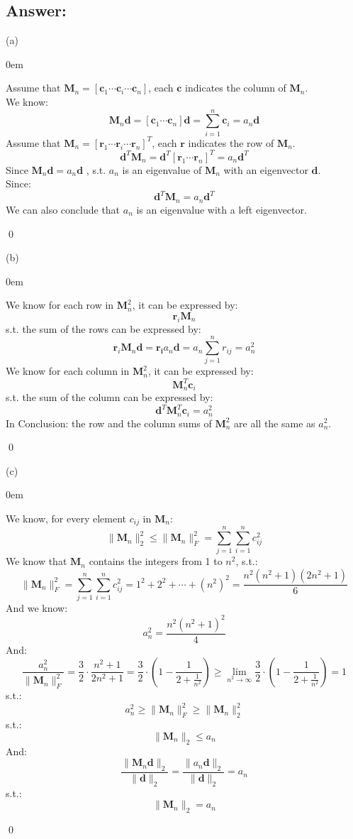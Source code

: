 \documentclass{article}
\renewenvironment{proof}{\begin{addmargin}[1em]{0em}\begin{newproof}}
{\end{newproof}\end{addmargin}\qed}
\begin{document}
\subsection*{Answer:}
(a)
\begin{proof}
    Assume that \(\bm{M}_n = [\bm{c}_1 \cdots \bm{c}_i \cdots \bm{c}_n]\), each \(\bm{c}\) indicates the column of \(\bm{M}_n\). \\
    We know:
    \[
    \bm{M}_n\bm{d} = [\bm{c}_1 \cdots \bm{c}_n ] \bm{d} = \sum_{i=1}^n \bm{c}_i = a_n\bm{d}
    \]
    Assume that \(\bm{M}_n = [\bm{r}_1 \cdots \bm{r}_i \cdots \bm{r}_n]^T\), each \(\bm{r}\) indicates the row of \(\bm{M}_n\). \\
    \[
    \bm{d}^T \bm{M}_n = \bm{d}^T [\bm{r}_1 \cdots \bm{r}_n]^T =  a_n\bm{d}^T
    \]
    Since \(\bm{M}_n\bm{d} = a_n\bm{d} \) , s.t. \(a_n\) is an eigenvalue of \(\bm{M}_n\) with an eigenvector \(\bm{d}\).  \\
    Since:
    \[
        \bm{d}^T\bm{M}_n =  a_n\bm{d}^T
    \]
    We can also conclude that \(a_n\) is an eigenvalue with a left eigenvector.

\end{proof}

(b)
\begin{proof}
    We know for each row in \(\bm{M}_n^2\), it can be expressed by:
    \[
    \bm{r}_i\bm{M}_n
    \]
    s.t. the sum of the rows can be expressed by:
    \[
    \bm{r}_i\bm{M}_n\bm{d} = \bm{r_i} a_n \bm{d} = a_n \sum_{j=1}^nr_{ij} = a_n^2
    \]
    We know for each column in \(\bm{M}_n^2\), it can be expressed by:
    \[
    \bm{M}_n^T\bm{c}_i
    \]
    s.t. the sum of the column can be expressed by:
    \[
    \bm{d}^T\bm{M}_n^T\bm{c}_i = a_n^2
    \]
    In Conclusion: the row and the column sums of \(\bm{M}_n^2\) are all the same as \(a_n^2\).
\end{proof}

(c)
\begin{proof}
We know, for every element \(c_{ij}\) in \(\bm{M}_n\):
\[
    \|\bm{M}_n\|_2^2 \leq \|\bm{M}_n\|_F^2 = \sum_{j=1}^n\sum_{i=1}^nc_{ij}^2
\]
We know that \(\bm{M}_n\) contains the integers from 1 to \(n^2\), s.t.:
\[
    \|\bm{M}_n\|_F^2 = \sum_{j=1}^n\sum_{i=1}^n c_{ij}^2 = 1^2 + 2^2 + \cdots + (n^2)^2 = \frac {n^2(n^2+1)(2n^2+1)}{6}
\]
And we know:
\[
    a_n^2 = \frac{n^2(n^2+1)^2}{4}
\]
And:
\[
    \frac{a_n^2}{\|\bm{M}_n\|_F^2} = \frac{3}{2} \cdot \frac{n^2+1}{2n^2+1} = \frac{3}{2} \cdot (1 - \frac{1}{2+\frac{1}{n^2}}) \geq \lim_{n^2 \to \infty} \frac{3}{2} \cdot (1 - \frac{1}{2+\frac{1}{n^2}}) = 1
\]
s.t.:
\[
    a_n^2 \geq \|\bm{M}_n\|_F^2 \geq \|\bm{M}_n\|_2^2
\]
s.t.:
\[
    \|\bm{M}_n\|_2   \leq a_n
\]
And:
\[
    \frac{\|\bm{M}_n\bm{d}\|_2}{\|\bm{d}\|_2} = \frac{\|a_n\bm{d}\|_2}{\|\bm{d}\|_2} = a_n
\]
s.t.:
\[
    \|\bm{M}_n\|_2 = a_n
\]
\end{proof}
\end{document}
